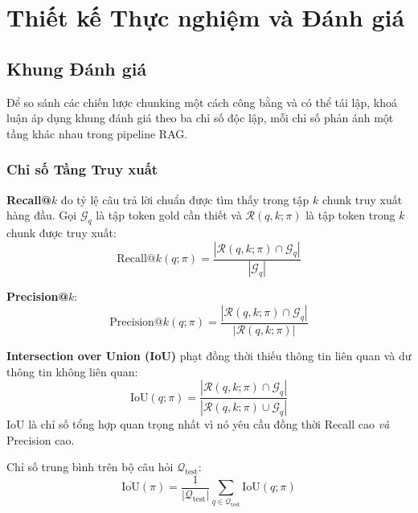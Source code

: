 \documentclass[12pt,a4paper]{report}
\theoremstyle{plain}
\theoremstyle{definition}
\begin{document}
	
	\chapter{Thiết kế Thực nghiệm và Đánh giá}
	\label{chap:experiments}
	
	\section{Khung Đánh giá}
	\label{sec:eval_framework}
	
	Để so sánh các chiến lược chunking một cách công bằng và có thể tái lập,
	khoá luận áp dụng khung đánh giá theo ba chỉ số độc lập, mỗi chỉ số phản
	ánh một tầng khác nhau trong pipeline RAG.
	
	\subsection{Chỉ số Tầng Truy xuất}
	\label{subsec:retrieval_metrics}
	
	\textbf{Recall@$k$} đo tỷ lệ câu trả lời chuẩn được tìm thấy trong tập
	$k$ chunk truy xuất hàng đầu. Gọi $\mathcal{G}_q$ là tập token gold cần
	thiết và $\mathcal{R}(q,k;\pi)$ là tập token trong $k$ chunk được truy xuất:
	\begin{equation}
		\text{Recall}@k(q;\pi) =
		\frac{|\mathcal{R}(q,k;\pi) \cap \mathcal{G}_q|}{|\mathcal{G}_q|}
		\label{eq:recall_k}
	\end{equation}
	
	\textbf{Precision@$k$}:
	\begin{equation}
		\text{Precision}@k(q;\pi) =
		\frac{|\mathcal{R}(q,k;\pi) \cap \mathcal{G}_q|}
		{|\mathcal{R}(q,k;\pi)|}
		\label{eq:precision_k}
	\end{equation}
	
	\textbf{Intersection over Union (IoU)} phạt đồng thời thiếu thông tin
	liên quan và dư thông tin không liên quan:
	\begin{equation}
		\text{IoU}(q;\pi) =
		\frac{|\mathcal{R}(q,k;\pi) \cap \mathcal{G}_q|}
		{|\mathcal{R}(q,k;\pi) \cup \mathcal{G}_q|}
		\label{eq:iou}
	\end{equation}
	IoU là chỉ số tổng hợp quan trọng nhất vì nó yêu cầu đồng thời Recall cao
	\emph{và} Precision cao.
	
	Chỉ số trung bình trên bộ câu hỏi $\mathcal{Q}_{\text{test}}$:
	\begin{equation}
		\overline{\text{IoU}}(\pi) =
		\frac{1}{|\mathcal{Q}_{\text{test}}|}
		\sum_{q \in \mathcal{Q}_{\text{test}}} \text{IoU}(q;\pi)
		\label{eq:mean_iou}
	\end{equation}
	
\end{document}
